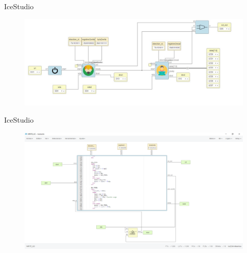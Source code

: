 \documentclass{beamer}
\begin{document}
\begin{frame}{IceStudio}
	\begin{figure}[H]
		\center
		\includegraphics[trim = 0cm 0mm 0mm 0cm,clip, angle=0, scale = 0.3]{imagenes/Introduction/i2creadandwrite}
	\end{figure}
\end{frame}

\begin{frame}{IceStudio}
\begin{figure}[H]
	\center
	\includegraphics[trim = 0cm 0mm 0mm 0cm,clip, angle=0, scale = 0.3]{imagenes/Introduction/IceStudioI2c}
\end{figure}
\end{frame}
\end{document}
